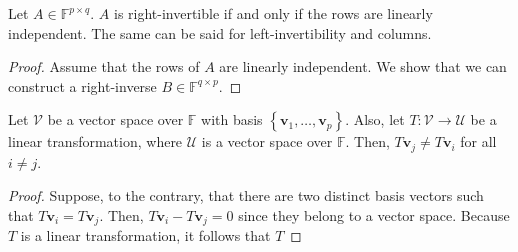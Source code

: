 \documentclass[12pt]{article}
\newenvironment{lemma}[2][Lemma]{\begin{trivlist} \item[\hskip \labelsep {\bfseries #1}\hskip \labelsep {\bfseries #2.}]}{\end{trivlist}}
\begin{document}
\begin{lemma}{1}
  Let $A\in \mathbb{F}^{p\times q}$. $A$ is right-invertible if and only if the rows are linearly independent. The same can be said for left-invertibility and columns.
\begin{proof}
  Assume that the rows of $A$ are linearly independent. We show that we can construct a right-inverse $B\in \mathbb{F}^{q\times p}$. 
\end{proof} 
\end{lemma}
\begin{lemma}{2}
  Let $\mathcal{V}$ be a vector space over $\mathbb{F}$ with basis $\left\{ \mathbf{v}_{1},\dots,\mathbf{v}_{p} \right\}$. Also, let $T:\mathcal{V}\to \mathcal{U}$ be a linear transformation, where $\mathcal{U}$ is a vector space over $\mathbb{F}$. Then, $T\mathbf{v}_{j} \neq T\mathbf{v}_{i}$ for all $i\neq j$. 
\begin{proof}
  Suppose, to the contrary, that there are two distinct basis vectors such that $T\mathbf{v}_{i} = T\mathbf{v}_{j}$. Then, $T\mathbf{v}_{i} - T\mathbf{v}_{j}=0$ since they belong to a vector space. Because $T$ is a linear transformation, it follows that $T$
\end{proof}
\end{lemma}
\end{document}
